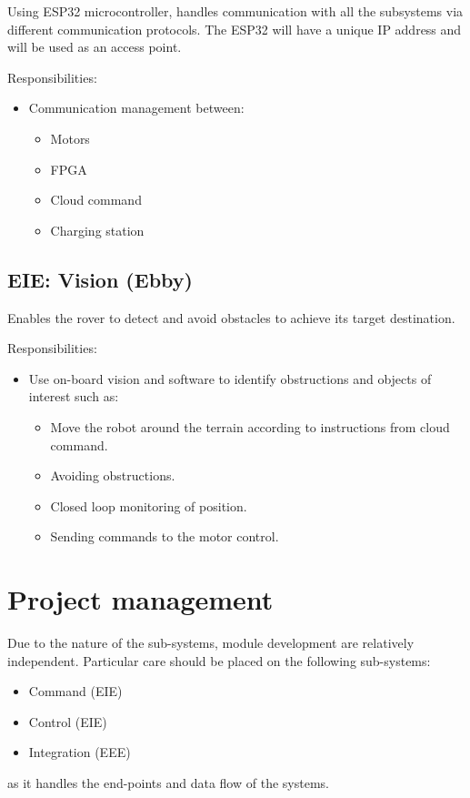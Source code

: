 \documentclass[10pt, a4paper]{article}
\begin{document}
Using ESP32 microcontroller, handles communication with all the subsystems via different communication protocols. The ESP32 will have a unique IP address and will be used as an access point.

Responsibilities:
\begin{itemize}
    \item  Communication management between:
    \begin{itemize}
        \item Motors 
        \item FPGA 
        \item Cloud command 
        \item Charging station 
    \end{itemize}
\end{itemize}

\subsection{EIE: Vision (Ebby)}

Enables the rover to detect and avoid obstacles to achieve its target destination. 

Responsibilities:
\begin{itemize}
    \item  Use on-board vision and software to identify obstructions and objects of interest such as:
    \begin{itemize}
        \item Move the robot around the terrain according to instructions from cloud command.
        \item Avoiding obstructions.   
        \item Closed loop monitoring of position.   
        \item Sending commands to the motor control. 
    \end{itemize}
\end{itemize}

\pagebreak

\section{Project management}

Due to the nature of the sub-systems, module development are relatively independent. Particular care should be placed on the following sub-systems:
\begin{itemize}
    \item Command (EIE) 
    \item Control (EIE)
    \item Integration (EEE)
\end{itemize}
as it handles the end-points and data flow of the systems.
\end{document}
